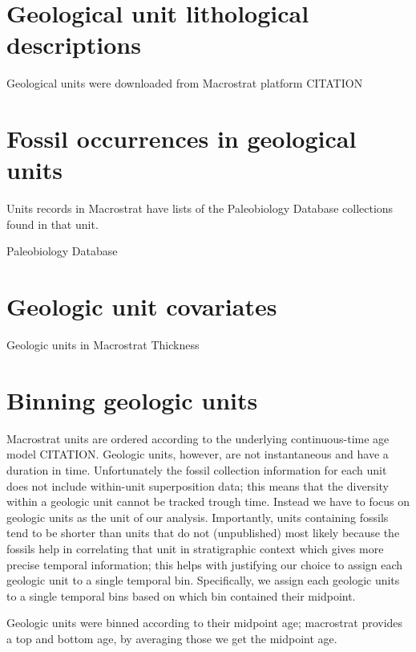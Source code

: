 \documentclass[12pt,letterpaper]{article}
\begin{document}
\section{Geological unit lithological descriptions}
Geological units were downloaded from Macrostrat platform CITATION 


\section{Fossil occurrences in geological units}
Units records in Macrostrat have lists of the Paleobiology Database collections found in that unit. 


Paleobiology Database




\section{Geologic unit covariates}


Geologic units in Macrostrat Thickness



\section{Binning geologic units}

Macrostrat units are ordered according to the underlying continuous-time age model CITATION. Geologic units, however, are not instantaneous and have a duration in time. Unfortunately the fossil collection information for each unit does not include within-unit superposition data; this means that the diversity within a geologic unit cannot be tracked trough time. Instead we have to focus on geologic units as the unit of our analysis. Importantly, units containing fossils tend to be shorter than units that do not (unpublished) most likely because the fossils help in correlating that unit in stratigraphic context which gives more precise temporal information; this helps with justifying our choice to assign each geologic unit to a single temporal bin. Specifically, we assign each geologic units to a single temporal bins based on which bin contained their midpoint. 



Geologic units were binned according to their midpoint age; macrostrat provides a top and bottom age, by averaging those we get the midpoint age.
\end{document}
